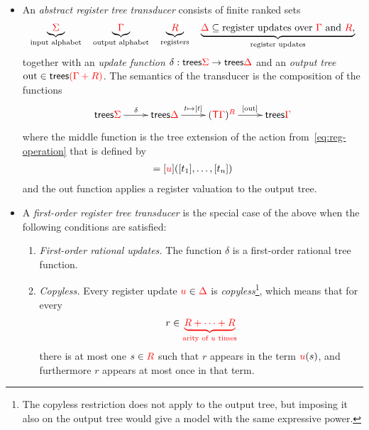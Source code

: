 \begin{definition}\label{def:stt}
\ 
    \begin{itemize}
        \item An  \emph{abstract register tree transducer} consists of finite ranked sets
        \begin{align*}
           \underbrace{{\color{red}{\Sigma}}}_{\text{input alphabet}} \quad 
           \underbrace{{\color{red}{\Gamma}}}_{\text{output alphabet}} \quad 
           \underbrace{{\color{red}{R}}}_{\text{registers}} \quad 
           \underbrace{{\color{red}{\Delta}} \subseteq \text{register updates over ${\color{red}{\Gamma}}$ and ${\color{red}{R}}$},}_{\text{register updates}}
        \end{align*}
           together with an \emph{update function} $\delta : \mathsf {trees} {\color{red}{\Sigma}} \to \mathsf {trees} {\color{red}{\Delta}}$ and an \emph{output tree} $\mathrm{out} \in \mathsf {trees} {\color{red}{(\Gamma + R)}}$. 
           The semantics of the transducer is the composition of the functions
    \begin{align*}
        \xymatrix{
            \trees \rSigma \ar[r]^{\delta} & \trees \rDelta \ar[r]^{t \mapsto [t]} & (\tmonad \rGamma)^\regnames \ar[r]^{[\outtree]} & \trees \rGamma
        }
    \end{align*}
    where the middle function is the tree extension of the action from~\eqref{eq:reg-operation} that is defined by 
    \begin{align*}
        [\ranked u \tensorpair{t_1,\ldots,t_n}] = [\ranked u]([t_1],\ldots,[t_n])
    \end{align*}
    and the out function applies a register valuation to the output tree. 
    \item A \emph{first-order register tree transducer} is the special case of the above when the following conditions are satisfied:
    \begin{enumerate}
        \item \emph{First-order rational updates.} The function $\delta$ is a first-order rational tree function.
        \item \emph{Copyless.} Every register update ${\color{red}{u}} \in {\color{red}{\Delta}}$ is \emph{copyless}\footnote{The copyless restriction does not apply to the output tree, but imposing it also on the output tree would give a model with the same expressive power.}, which means that for every
        \begin{align*}
            r \in {\color{red}{\underbrace{{{\color{red}{R}}}+ \cdots + {{\color{red}{R}}}}_{\text{arity of $u$ times}}}}
        \end{align*}
        there is at most one $s \in {{\color{red}{R}}}$ such that $r$ appears in the term  ${\color{red}{u}}(s)$, and furthermore $r$ appears at most once in that term.  

\end{enumerate}
\end{itemize}
\end{definition}
